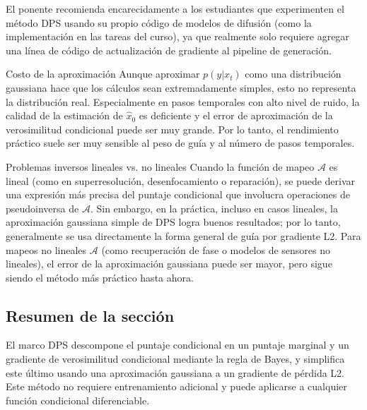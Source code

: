 El ponente recomienda encarecidamente a los estudiantes que experimenten el método DPS usando su propio código de modelos de difusión (como la implementación en las tareas del curso), ya que realmente solo requiere agregar una línea de código de actualización de gradiente al pipeline de generación.

\begin{warningbox}{Costo de la aproximación}
Aunque aproximar $p(y|x_t)$ como una distribución gaussiana hace que los cálculos sean extremadamente simples, esto no representa la distribución real. Especialmente en pasos temporales con alto nivel de ruido, la calidad de la estimación de $\hat{x}_0$ es deficiente y el error de aproximación de la verosimilitud condicional puede ser muy grande. Por lo tanto, el rendimiento práctico suele ser muy sensible al peso de guía y al número de pasos temporales.
\end{warningbox}

\begin{knowledgebox}{Problemas inversos lineales vs. no lineales}
Cuando la función de mapeo $\mathcal{A}$ es lineal (como en superresolución, desenfocamiento o reparación), se puede derivar una expresión más precisa del puntaje condicional que involucra operaciones de pseudoinversa de $\mathcal{A}$. Sin embargo, en la práctica, incluso en casos lineales, la aproximación gaussiana simple de DPS logra buenos resultados; por lo tanto, generalmente se usa directamente la forma general de guía por gradiente L2. Para mapeos no lineales $\mathcal{A}$ (como recuperación de fase o modelos de sensores no lineales), el error de la aproximación gaussiana puede ser mayor, pero sigue siendo el método más práctico hasta ahora.
\end{knowledgebox}

\subsection{Resumen de la sección}

El marco DPS descompone el puntaje condicional en un puntaje marginal y un gradiente de verosimilitud condicional mediante la regla de Bayes, y simplifica este último usando una aproximación gaussiana a un gradiente de pérdida L2. Este método no requiere entrenamiento adicional y puede aplicarse a cualquier función condicional diferenciable.
